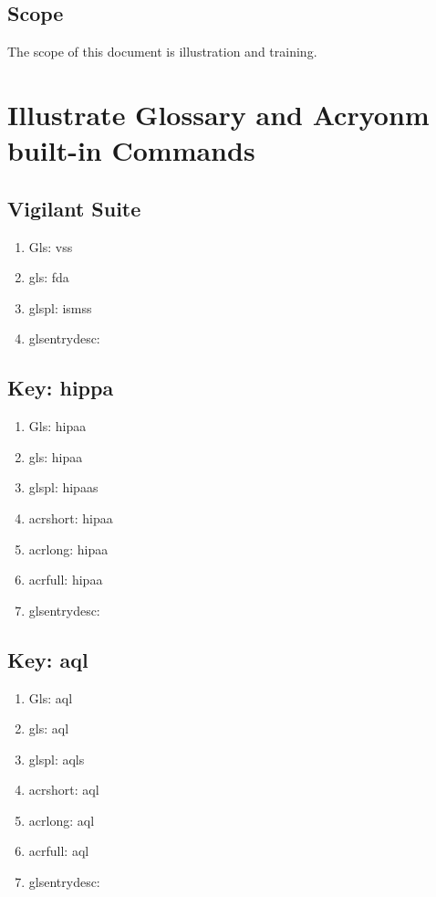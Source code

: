\subsection{Scope}
The scope of this document is illustration and training.

\section{Illustrate Glossary and Acryonm built-in Commands}

\subsection{Vigilant Suite}
\begin{enumerate}
  \item Gls:                   \Gls{vss}
  \item gls:                   \gls{fda}
  \item glspl:               \glspl{isms}
  \item glsentrydesc: 
\end{enumerate}

\subsection{Key: hippa}
\begin{enumerate}
  \item Gls:                   \Gls{hipaa}
  \item gls:                   \gls{hipaa}
  \item glspl:               \glspl{hipaa}
  \item acrshort:         \acrshort{hipaa}
  \item acrlong:           \acrlong{hipaa}
  \item acrfull:           \acrfull{hipaa}
  \item glsentrydesc: 
\end{enumerate}

\subsection{Key: aql}
\begin{enumerate}
  \item Gls:                   \Gls{aql}
  \item gls:                   \gls{aql}
  \item glspl:               \glspl{aql}
  \item acrshort:         \acrshort{aql}
  \item acrlong:           \acrlong{aql}
  \item acrfull:           \acrfull{aql}
  \item glsentrydesc: 
\end{enumerate}

